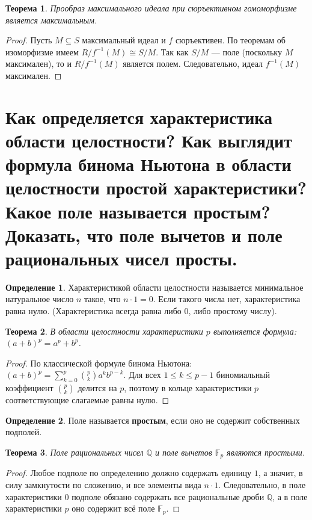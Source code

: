 \documentclass[12pt, a4paper]{article}
\theoremstyle{definition}
\newtheorem{definition}{Определение}[section]
\theoremstyle{plain}
\newtheorem{theorem}{Теорема}[section]
\begin{document}
	\begin{theorem}
		Прообраз максимального идеала при сюръективном гомоморфизме является максимальным.
	\end{theorem}
	\begin{proof}
		Пусть $M \subseteq S$ максимальный идеал и $f$ сюръективен. По теоремам об изоморфизме имеем $R/f^{-1}(M) \cong S/M$. Так как $S/M$ — поле (поскольку $M$ максимален), то и $R/f^{-1}(M)$ является полем. Следовательно, идеал $f^{-1}(M)$ максимален.
	\end{proof}
	
	\newpage
	\section{Как определяется характеристика области целостности? Как выглядит формула бинома Ньютона в области целостности простой характеристики? Какое поле называется простым? Доказать, что поле вычетов и поле рациональных чисел просты.}
	
	\begin{definition}
		Характеристикой области целостности называется минимальное натуральное число $n$ такое, что $n \cdot 1 = 0$. Если такого числа нет, характеристика равна нулю. (Характеристика всегда равна либо 0, либо простому числу).
	\end{definition}
	
	\begin{theorem}
		В области целостности характеристики $p$ выполняется формула: $(a+b)^p = a^p + b^p$.
	\end{theorem}
	\begin{proof}
		По классической формуле бинома Ньютона: $(a+b)^p = \sum_{k=0}^p \binom{p}{k} a^k b^{p-k}$. Для всех $1 \le k \le p-1$ биномиальный коэффициент $\binom{p}{k}$ делится на $p$, поэтому в кольце характеристики $p$ соответствующие слагаемые равны нулю.
	\end{proof}
	
	\begin{definition}
		Поле называется \textbf{простым}, если оно не содержит собственных подполей.
	\end{definition}
	
	\begin{theorem}
		Поле рациональных чисел $\mathbb{Q}$ и поле вычетов $\mathbb{F}_p$ являются простыми.
	\end{theorem}
	\begin{proof}
		Любое подполе по определению должно содержать единицу $1$, а значит, в силу замкнутости по сложению, и все элементы вида $n \cdot 1$. Следовательно, в поле характеристики 0 подполе обязано содержать все рациональные дроби $\mathbb{Q}$, а в поле характеристики $p$ оно содержит всё поле $\mathbb{F}_p$.
	\end{proof}
	
\end{document}
